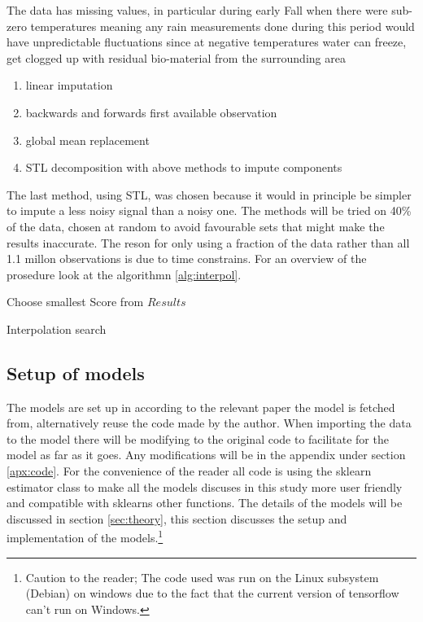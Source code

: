 The data has missing values, in particular during early Fall when there were sub-zero temperatures meaning any rain measurements done during this period would have unpredictable fluctuations since at negative temperatures water can freeze, get clogged up with residual bio-material from the surrounding area

\begin{enumerate}
	\item linear imputation
	\item backwards and forwards first available observation
	\item global mean replacement
	\item STL decomposition with above methods to impute components
\end{enumerate}

The last method, using STL, was chosen because it would in principle be simpler to impute a less noisy signal than a noisy one. The methods will be tried on 40\% of the data, chosen at random to avoid favourable sets that might make the results inaccurate. The reson for only using a fraction of the data rather than all 1.1 millon observations is due to time constrains. For an overview of the prosedure look at the algorithmn \ref{alg:interpol}. 

\begin{algorithm}[h]
	\SetAlgoLined
	Choose smallest Score from $Results$\;
	\caption{Interpolation search}
	\label{alg:interpol}
\end{algorithm}

\subsection{Setup of models}

The models are set up in according to the relevant paper the model is fetched from, alternatively reuse the code made by the author. When importing the data to the model there will be modifying to the original code to facilitate for the model as far as it goes. Any modifications will be in the appendix under section \ref{apx:code}. For the convenience of the reader all code is using the sklearn estimator class to make all the models discuses in this study more user friendly and compatible with sklearns other functions. The details of the models will be discussed in section \ref{sec:theory}, this section discusses the setup and implementation of the models.\footnote{Caution to the reader; The code used was run on the Linux subsystem (Debian) on windows due to the fact that the current version of tensorflow can't run on Windows.}

